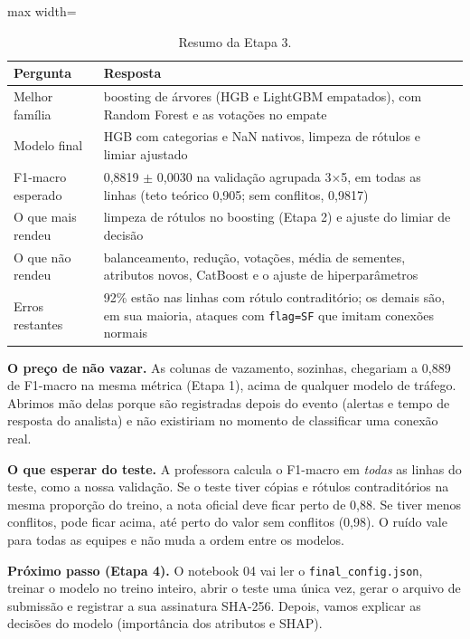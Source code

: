 \documentclass[11pt,a4paper]{article}
\begin{document}
\begin{table}[H]
\centering
\caption{Resumo da Etapa 3.}
\begin{adjustbox}{max width=\linewidth}
\begin{tabular}{p{4.2cm}p{11.6cm}}
\toprule
Pergunta & Resposta \\
\midrule
Melhor família & boosting de árvores (HGB e LightGBM empatados), com Random Forest e as votações no empate \\
Modelo final & HGB com categorias e NaN nativos, limpeza de rótulos e limiar ajustado \\
F1-macro esperado & 0,8819 $\pm$ 0,0030 na validação agrupada 3$\times$5, em todas as linhas (teto teórico 0,905; sem conflitos, 0,9817) \\
O que mais rendeu & limpeza de rótulos no boosting (Etapa 2) e ajuste do limiar de decisão \\
O que não rendeu & balanceamento, redução, votações, média de sementes, atributos novos, CatBoost e o ajuste de hiperparâmetros \\
Erros restantes & 92\% estão nas linhas com rótulo contraditório; os demais são, em sua maioria, ataques com \texttt{flag=SF} que imitam conexões normais \\
\bottomrule
\end{tabular}
\end{adjustbox}
\end{table}

\textbf{O preço de não vazar.} As colunas de vazamento, sozinhas, chegariam a 0,889 de F1-macro na mesma métrica (Etapa 1), acima de qualquer modelo de tráfego. Abrimos mão delas porque são registradas depois do evento (alertas e tempo de resposta do analista) e não existiriam no momento de classificar uma conexão real.

\textbf{O que esperar do teste.} A professora calcula o F1-macro em \emph{todas} as linhas do teste, como a nossa validação. Se o teste tiver cópias e rótulos contraditórios na mesma proporção do treino, a nota oficial deve ficar perto de 0,88. Se tiver menos conflitos, pode ficar acima, até perto do valor sem conflitos (0,98). O ruído vale para todas as equipes e não muda a ordem entre os modelos.

\textbf{Próximo passo (Etapa 4).} O notebook 04 vai ler o \texttt{final\_config.json}, treinar o modelo no treino inteiro, abrir o teste uma única vez, gerar o arquivo de submissão e registrar a sua assinatura SHA-256. Depois, vamos explicar as decisões do modelo (importância dos atributos e SHAP).
\end{document}
